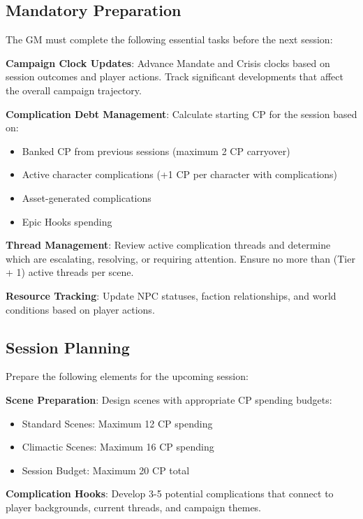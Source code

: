 \subsection{Mandatory Preparation}

The GM must complete the following essential tasks before the next session:

\textbf{Campaign Clock Updates}: Advance Mandate and Crisis clocks based on session outcomes and player actions. Track significant developments that affect the overall campaign trajectory.

\textbf{Complication Debt Management}: Calculate starting CP for the session based on:
\begin{itemize}
    \item Banked CP from previous sessions (maximum 2 CP carryover)
    \item Active character complications (+1 CP per character with complications)
    \item Asset-generated complications
    \item Epic Hooks spending
\end{itemize}

\textbf{Thread Management}: Review active complication threads and determine which are escalating, resolving, or requiring attention. Ensure no more than (Tier + 1) active threads per scene.

\textbf{Resource Tracking}: Update NPC statuses, faction relationships, and world conditions based on player actions.

\subsection{Session Planning}

Prepare the following elements for the upcoming session:

\textbf{Scene Preparation}: Design scenes with appropriate CP spending budgets:
\begin{itemize}
    \item Standard Scenes: Maximum 12 CP spending
    \item Climactic Scenes: Maximum 16 CP spending
    \item Session Budget: Maximum 20 CP total
\end{itemize}

\textbf{Complication Hooks}: Develop 3-5 potential complications that connect to player backgrounds, current threads, and campaign themes.

